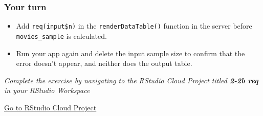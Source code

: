 \documentclass[
  letterpaper,
  DIV=11,
  numbers=noendperiod]{scrreprt}
\begin{document}
\hypertarget{your-turn-11}{%
\subsubsection{Your turn}\label{your-turn-11}}

\begin{itemize}
\item
  Add \texttt{req(input\$n)} in the \texttt{renderDataTable()} function
  in the server before \texttt{movies\_sample} is calculated.
\item
  Run your app again and delete the input sample size to confirm that
  the error doesn't appear, and neither does the output table.
\end{itemize}

\emph{Complete the exercise by navigating to the RStudio Cloud Project
titled \textbf{2-2b req} in your RStudio Workspace}

\href{https://rstudio.cloud/spaces/81721/join?access_code=I4VJaNsKfTqR3Td9hLP7E1nz8\%2FtMg6Xbw9Bgqumv}{
Go to RStudio Cloud Project}
\end{document}
